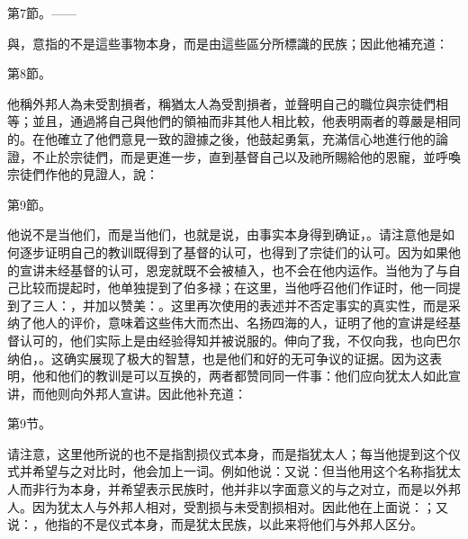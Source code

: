 第7節。——\par

與，意指的不是這些事物本身，而是由這些區分所標識的民族；因此他補充道：\par

第8節。\par

他稱外邦人為未受割損者，稱猶太人為受割損者，並聲明自己的職位與宗徒們相等；並且，通過將自己與他們的領袖而非其他人相比較，他表明兩者的尊嚴是相同的。在他確立了他們意見一致的證據之後，他鼓起勇氣，充滿信心地進行他的論證，不止於宗徒們，而是更進一步，直到基督自己以及祂所賜給他的恩寵，並呼喚宗徒們作他的見證人，說：\par

第9節。\par

他说不是当他们，而是当他们，也就是说，由事实本身得到确证，。请注意他是如何逐步证明自己的教训既得到了基督的认可，也得到了宗徒们的认可。因为如果他的宣讲未经基督的认可，恩宠就既不会被植入，也不会在他内运作。当他为了与自己比较而提起时，他单独提到了伯多禄；在这里，当他呼召他们作证时，他一同提到了三人：，并加以赞美：。这里再次使用的表述并不否定事实的真实性，而是采纳了他人的评价，意味着这些伟大而杰出、名扬四海的人，证明了他的宣讲是经基督认可的，他们实际上是由经验得知并被说服的。伸向了我，不仅向我，也向巴尔纳伯，。这确实展现了极大的智慧，也是他们和好的无可争议的证据。因为这表明，他和他们的教训是可以互换的，两者都赞同同一件事：他们应向犹太人如此宣讲，而他则向外邦人宣讲。因此他补充道：\par

第9节。\par

请注意，这里他所说的也不是指割损仪式本身，而是指犹太人；每当他提到这个仪式并希望与之对比时，他会加上一词。例如他说：又说：但当他用这个名称指犹太人而非行为本身，并希望表示民族时，他并非以字面意义的与之对立，而是以外邦人。因为犹太人与外邦人相对，受割损与未受割损相对。因此他在上面说：；又说：，他指的不是仪式本身，而是犹太民族，以此来将他们与外邦人区分。\par

